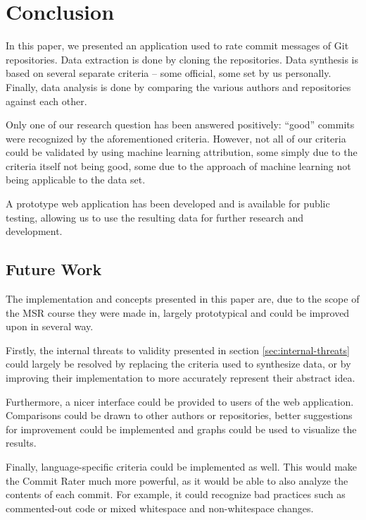 \section{Conclusion}
\label{sec:conclusion}

In this paper, we presented an application used to rate commit messages of Git repositories. Data extraction is done by cloning the repositories. Data synthesis is based on several separate criteria -- some official, some set by us personally. Finally, data analysis is done by comparing the various authors and repositories against each other.

Only one of our research question has been answered positively: ``good'' commits were recognized by the aforementioned criteria. However, not all of our criteria could be validated by using machine learning attribution, some simply due to the criteria itself not being good, some due to the approach of machine learning not being applicable to the data set.

A prototype web application has been developed and is available for public testing, allowing us to use the resulting data for further research and development.


\subsection{Future Work}
\label{sec:future-work}

The implementation and concepts presented in this paper are, due to the scope of the MSR course they were made in, largely prototypical and could be improved upon in several way.

Firstly, the internal threats to validity presented in section \ref{sec:internal-threats} could largely be resolved by replacing the criteria used to synthesize data, or by improving their implementation to more accurately represent their abstract idea.

Furthermore, a nicer interface could be provided to users of the web application. Comparisons could be drawn to other authors or repositories, better suggestions for improvement could be implemented and graphs could be used to visualize the results.

Finally, language-specific criteria could be implemented as well. This would make the Commit Rater much more powerful, as it would be able to also analyze the contents of each commit. For example, it could recognize bad practices such as commented-out code or mixed whitespace and non-whitespace changes.

